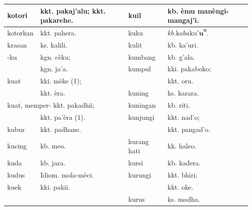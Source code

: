 \documentclass[10pt]{article}
\begin{document}
\begin{center}
\begin{tabular}{|l|l|l|l|}
\hline
kotori & kkt. pakaj'alu; kkt. pakarehe. & kuil & kb. èmu manèngi-mangaj'i. \\
\hline
kotorkan & kkt. pahera. & kuku & \(k b . \mathrm{k} a b a \mathrm{ku} \mathbf{' u}^{\mathbf{u}}\). \\
\hline
krasan & ks. kalili. & kulit & kb. ka'uri. \\
\hline
-ku & kgn. cèku; & kumbang & kb. g'ala. \\
\hline
 & kgn. ja'a. & kumpul & kki. pakaboko; \\
\hline
kuat & kki. mèke (1); &  & kkt. oru. \\
\hline
 & kkt. èra. & kuning & ks. karara. \\
\hline
\multicolumn{2}{|l|}{kuat, memper- kkt. pakadhii;} & kuningan & kb. riti. \\
\hline
 & kkt. pa'èra (1). & kunjungi & kkt. nad'o; \\
\hline
kubur & kkt. padhane. &  & kkt. pangad'o. \\
\hline
kucing & kb. meo. & kurang hati & kk. haleo. \\
\hline
kuda & kb. jara. & kursi & kb. kadera. \\
\hline
kudus & Idiom. mola-mèci. & kurungi & kkt. bhiri; \\
\hline
kuek & kki. pakii. &  & kkt. oke. \\
\hline
 &  & kurus & ks. modha. \\
\hline
\end{tabular}
\end{center}
\end{document}
